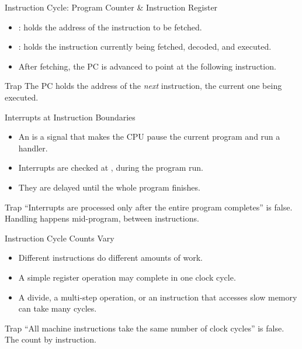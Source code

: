 \documentclass[aspectratio=169]{beamer}
\begin{document}
\begin{frame}{Instruction Cycle: Program Counter \& Instruction Register}
  \begin{itemize}
    \item {}: holds the address of the 
      instruction to be fetched.
    \item {}: holds the instruction currently
      being fetched, decoded, and executed.
    \item After fetching, the PC is advanced to point at the following
      instruction.
  \end{itemize}
  \begin{alertblock}{Trap}
    The PC holds the address of the \emph{next} instruction,  the
    current one being executed.
  \end{alertblock}
\end{frame}

\begin{frame}{Interrupts at Instruction Boundaries}
  \begin{itemize}
    \item An  is a signal that makes the CPU pause the current
      program and run a handler.
    \item Interrupts are checked at , during the
      program run.
    \item They are  delayed until the whole program finishes.
  \end{itemize}
  \begin{alertblock}{Trap}
    ``Interrupts are processed only after the entire program completes'' is
    false. Handling happens mid-program, between instructions.
  \end{alertblock}
\end{frame}

\begin{frame}{Instruction Cycle Counts Vary}
  \begin{itemize}
    \item Different instructions do different amounts of work.
    \item A simple register operation may complete in one clock cycle.
    \item A divide, a multi-step operation, or an instruction that accesses
      slow memory can take many cycles.
  \end{itemize}
  \begin{alertblock}{Trap}
    ``All machine instructions take the same number of clock cycles'' is
    false. The count  by instruction.
  \end{alertblock}
\end{frame}
\end{document}
